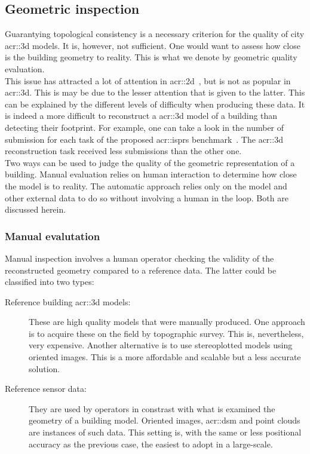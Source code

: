     \subsection{Geometric inspection}
        \label{subsec::introduction::building_model_evaluation::geometric}
        Guarantying topological consistency is a necessary criterion for the quality of city \gls{acr::3d} models.
        It is, however, not sufficient.
        One would want to assess how close is the building geometry to reality.
        This is what we denote by geometric quality evaluation.\\
        This issue has attracted a lot of attention in \gls{acr::2d}~\parencite{mooney2010towards}, but is not as popular in \gls{acr::3d}.
        This is may be due to the lesser attention that is given to the latter.
        This can be explained by the different levels of difficulty when producing these data.
        It is indeed a more difficult to reconstruct a \gls{acr::3d} model of a building than detecting their footprint.
        For example, one can take a look in the number of submission for each task of the proposed \gls{acr::isprs} benchmark~\parencite{rottensteiner2012isprs, rottensteiner2014results}.
        The \gls{acr::3d} reconstruction task received less submissions than the other one.\\
        Two ways can be used to judge the quality of the geometric representation of a building.
        Manual evaluation relies on human interaction to determine how close the model is to reality.
        The automatic approach relies only on the model and other external data to do so without involving a human in the loop.
        Both are discussed herein.

        \subsubsection{Manual evalutation}
            Manual inspection involves a human operator checking the validity of the reconstructed geometry compared to a reference data.
            The latter could be classified into two types:
            \begin{description}
                \item[Reference building \gls{acr::3d} models:] These are high quality models that were manually produced.
                    One approach is to acquire these on the field by topographic survey.
                    This is, nevertheless, very expensive.
                    Another alternative is to use stereoplotted models using oriented images.
                    This is a more affordable and scalable but a less accurate solution.
                \item[Reference sensor data:] They are used by operators in constrast with what is examined the geometry of a building model.
                    Oriented images, \gls{acr::dsm} and point clouds are instances of such data.
                    This setting is, with the same or less positional accuracy as the previous case, the easiest to adopt in a large-scale.
            \end{description}

